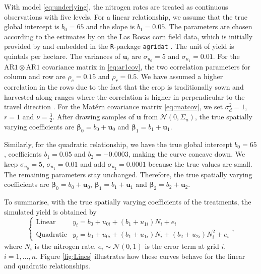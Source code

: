\documentclass[a4paper]{article} 	%
\newcommand{\Matern}{Mat\'ern }
\newcommand{\N}{\mathcal{N}}
\newcommand{\AR}{\mathrm{AR1}}
\begin{document}
With model \eqref{eq:underlying}, the nitrogen rates are treated as continuous observations with five levels. For a linear relationship, we assume that the true global intercept is $b_0 = 65$ and the slope is $b_1=0.05$. The parameters are chosen according to the estimates by \textcite{Rakshit2020Novel, Cao2022Bayesian} on the Las Rosas corn field data, which is initially provided by \textcite{Luc2004ASpatial} and embedded in the \texttt{R}-package \texttt{agridat} \parencite{White2008Agridat}. The unit of yield is quintals per hectare. The variances of $\bm{u}_i$ are $\sigma_{u_0} = 5$ and $\sigma_{u_1}=0.01$. For the $\AR\otimes\AR$ covariance matrix in \eqref{eq:ar1cov}, the two correlation parameters for column and row are $\rho_c = 0.15$ and $\rho_r=0.5$. We have assumed a higher correlation in the rows due to the fact that the crop is traditionally sown and harvested along ranges where the correlation is higher in perpendicular to the travel direction \parencite{Marchant2019Establishinga}. For the \Matern covariance matrix \eqref{eq:matcov}, we set $\sigma_d^2=1$, $r=1$ and $\nu = \frac{3}{2}$. After drawing samples of $\bm{u}$ from $\N(0,\Sigma_u)$, the true spatially varying coefficients are $\bm{\beta}_0 = b_0 + \bm{u}_0$ and $\bm{\beta}_1 = b_1 + \bm{u}_1$. 

Similarly, for the quadratic relationship, we have the true global intercept $b_0 = 65$, coefficients $b_1 = 0.05$ and $b_2 = -0.0003$, 
making the curve concave down. We keep $\sigma_{u_0} = 5$, $\sigma_{u_1}=0.01$ and add $\sigma_{u_2}=0.0001$ because the true values are small. The remaining parameters stay unchanged. Therefore, the true spatially varying coefficients are $\bm{\beta}_0 = b_0 + \bm{u}_0$, $\bm{\beta}_1 = b_1 + \bm{u}_1$ and $\bm{\beta}_2 = b_2 + \bm{u}_2$.

To summarise, with the true spatially varying coefficients of the treatments, the simulated yield is obtained by 
\begin{equation}
\begin{cases}
	\text{Linear}  &y_i = b_0 + u_{0i} + (b_1 + u_{1i})N_i + e_i \\
	\text{Quadratic} &y_i = b_0 + u_{0i} + (b_1 + u_{1i})N_i + (b_2 + u_{2i})N_i^2 + e_i
\end{cases},
\end{equation}
where $N_i$ is the nitrogen rate, $e_i\sim \N(0,1)$ is the error term at grid $i$, $i = 1, \ldots, n$. Figure \ref{fig:Lines} illustrates how these curves behave for the linear and quadratic relationships.
\end{document}
